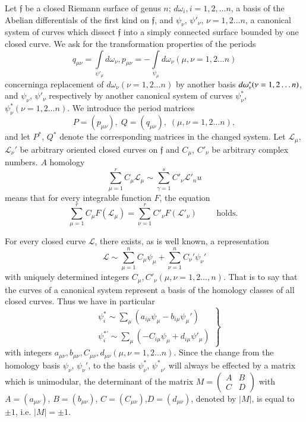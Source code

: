 Let $\mathfrak{f}$ be a closed Riemann surface of genus $n$; $d
\omega_i,i=1,2,\ldots n$, a basis of the Abelian differentials of the
first kind on $\mathfrak{f}$, and $\psi_{\nu}$, $\psi'_{\nu}$,
$\nu = 1, 2 \ldots n$, a canonical system of curves which dissect
$\mathfrak{f}$ into a simply connected surface bounded by one closed
curve. We ask for the transformation properties of the periods 
$$ 
q_{\mu \nu} = \int\limits_{\psi'_{\mu}}  d\omega_{\nu} , p_{\mu 
  \nu} = - \int\limits_{\psi_{\mu}}  d\omega_{\nu}  (\mu,\nu =
1,2 \ldots n) 
$$
concerning\pageoriginale a replacement of $d \omega_{\nu} (\nu = 1, 2
\ldots n)$ by 
another basis $d \omega_{\nu}^*\break (\nu = 1,2 \ldots n)$, and
$\psi_{\nu}$, $\psi'_{\nu}$ respectively by another canonical
system of curves $\psi_{\nu}^*$, $\psi^*_{\nu}  (\nu = 1,2
\ldots n)$. We introduce the period matrices 
$$
P = (p_{\mu \nu}),  \; Q = (q_{\mu \nu}), \; (\mu,\nu = 1,2 \ldots n),
$$
and let $P^*$, $Q^*$ denote the corresponding matrices in the changed
system. Let $\mathscr{L}_{\mu}$, $\mathscr{L}_{\nu}'$ be arbitrary oriented
closed curves on $\mathfrak{f}$ and $C_{\mu}$, $C'_{\nu}$ be arbitrary
complex numbers. $A$ homology  
$$
\sum^r_{\mu = 1} C_{\mu}  \mathscr{L}_{\mu} \sim \sum\limits_{\gamma=1}^s
C'_{\nu}  \mathscr{L}'_nu 
$$
means that for every integrable function $F$, the equation
$$
\sum^r_{\mu=1}  C_{\mu} F(\mathscr{L}_{\mu}) = \sum^r_{\nu = 1}
C'_{\nu} F(\mathscr{L}'_{\nu}) \qquad \text{ holds. } 
$$

For every closed curve $\mathscr{L}$, there exists, as is well known,
a representation 
$$
\mathscr{L} \sim \sum^n_{\mu = 1} C_{\mu} \psi_{\mu} +
\sum_{\nu = 1}^n  C_{\nu}'  \psi_{\nu}' 
$$
with uniquely determined integers $C_{\mu}, C'_{\nu} (\mu, \nu = 1, 2
\ldots, n)$. That is to say that the curves of a canonical system
represent a basis of the homology classes of all closed curves. Thus
we have in particular 
\begin{equation*}
\left.
\begin{aligned}
& \psi^*_i   \sim \sum_{\mu} (a_{i \mu} \psi_{\mu} - b_{i
    \mu} \psi_{\mu}')\\ 
& \psi^{*'}_i  \sim \sum_{\mu} (-C_{i \mu} \psi_\mu +
  d_{i \mu} \psi'_\mu ) 
\end{aligned}
\right \} \tag{1}\label{eq1}
\end{equation*}
with integers $a_{\mu \nu}, b_{\mu \nu}, C_{\mu \nu}, d_{\mu \nu} 
(\mu, \nu = 1, 2 \ldots n)$. Since the change from the homology basis
$\psi_{\nu}$, $\psi_{\nu}'$, to the basis
$\psi^{*}_{\nu}$, ${\psi^{*}}_{\nu'}$ will always be effected
by a matrix which is unimodular, the determinant of the matrix 
$M = \begin{pmatrix}
 A & B \\ 
C & D
\end{pmatrix}$ with $A = (a_{\mu \nu})$, $B = (b_{\mu \nu})$, $C = (C_{\mu
  \nu})$,\pageoriginale $D = (d_{\mu \nu})$, denoted by $|M|$, is
equal to $\pm   1$, i.e. $|M| = \pm 1$.    

